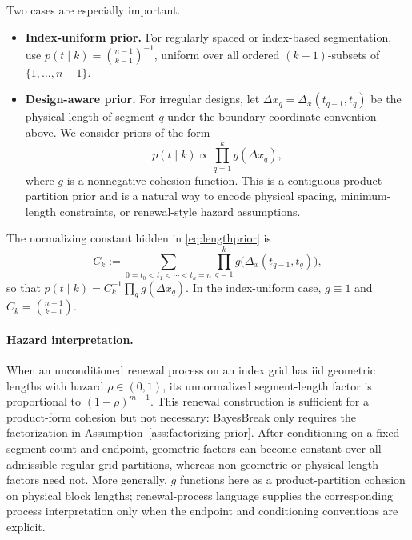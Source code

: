 Two cases are especially important.
\begin{itemize}
\item \textbf{Index-uniform prior.}
For regularly spaced or index-based segmentation, use
$p(t\mid k)=\binom{n-1}{k-1}^{-1}$, uniform over all ordered $(k-1)$-subsets of
$\{1,\dots,n-1\}$.

\item \textbf{Design-aware prior.}
For irregular designs, let $\Delta x_q=\Delta_x(t_{q-1},t_q)$ be the physical length of segment
$q$ under the boundary-coordinate convention above. We consider priors of the form
\begin{equation}
p(t\mid k) \propto \prod_{q=1}^k g(\Delta x_q),
\label{eq:lengthprior}
\end{equation}
where $g$ is a nonnegative cohesion function. This is a contiguous product-partition prior and is
a natural way to encode physical spacing, minimum-length constraints, or renewal-style hazard
assumptions.
\end{itemize}

The normalizing constant hidden in \eqref{eq:lengthprior} is
\begin{equation}
C_k := \sum_{0=t_0<t_1<\cdots<t_k=n} \prod_{q=1}^k g\bigl(\Delta_x(t_{q-1},t_q)\bigr),
\label{eq:Ck-setup}
\end{equation}
so that $p(t\mid k)=C_k^{-1}\prod_q g(\Delta x_q)$. In the index-uniform case, $g\equiv 1$ and
$C_k=\binom{n-1}{k-1}$.

\paragraph{Hazard interpretation.}
When an unconditioned renewal process on an index grid has iid geometric lengths with hazard
$\rho\in(0,1)$, its unnormalized segment-length factor is proportional to
$(1-\rho)^{m-1}$. This renewal construction is sufficient for a product-form cohesion but not
necessary: BayesBreak only requires the factorization in Assumption~\ref{ass:factorizing-prior}.
After conditioning on a fixed segment count and endpoint, geometric factors can become constant
over all admissible regular-grid partitions, whereas non-geometric or physical-length factors need
not. More generally, $g$ functions here as a product-partition cohesion on physical block lengths;
renewal-process language supplies the corresponding process interpretation only when the endpoint
and conditioning conventions are explicit.

